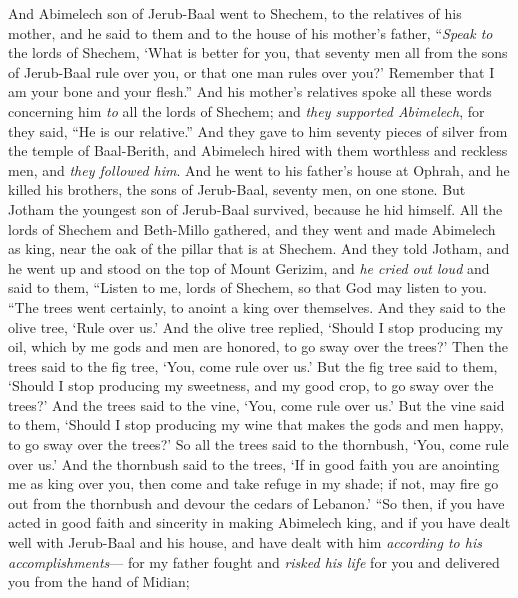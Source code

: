 \begin{biblechapter} %
 And Abimelech son of Jerub-Baal went to Shechem, to the relatives of his mother, and he said to them and to the house of his mother’s father,
\verse “\textit{Speak to} the lords of Shechem, ‘What is better for you, that seventy men all from the sons of Jerub-Baal rule over you, or that one man rules over you?’ Remember that I am your bone and your flesh.”
\verse And his mother’s relatives spoke all these words concerning him \textit{to} all the lords of Shechem; and \textit{they supported Abimelech}, for they said, “He is our relative.”
\verse And they gave to him seventy pieces of silver from the temple of Baal-Berith, and Abimelech hired with them worthless and reckless men, and \textit{they followed him}.
\verse And he went to his father’s house at Ophrah, and he killed his brothers, the sons of Jerub-Baal, seventy men, on one stone. But Jotham the youngest son of Jerub-Baal survived, because he hid himself.
\verse All the lords of Shechem and Beth-Millo gathered, and they went and made Abimelech as king, near the oak of the pillar that is at Shechem.
\verse And they told Jotham, and he went up and stood on the top of Mount Gerizim, and \textit{he cried out loud} and said to them, “Listen to me, lords of Shechem, so that God may listen to you.
\verse “The trees went certainly, 
to anoint a king over themselves. 
And they said to the olive tree, 
‘Rule over us.’
\verse And the olive tree replied, 
‘Should I stop producing my oil, 
which by me gods and men are honored, 
to go sway over the trees?’
\verse Then the trees said to the fig tree, 
‘You, come rule over us.’
\verse But the fig tree said to them, 
‘Should I stop producing my sweetness, 
and my good crop, 
to go sway over the trees?’
\verse And the trees said to the vine, 
‘You, come rule over us.’
\verse But the vine said to them, 
‘Should I stop producing my wine 
that makes the gods and men happy, 
to go sway over the trees?’
\verse So all the trees said to the thornbush, 
‘You, come rule over us.’
\verse And the thornbush said to the trees, 
‘If in good faith you are anointing 
me as king over you, 
then come and take refuge in my shade; 
if not, may fire go out from the thornbush 
and devour the cedars of Lebanon.’
\verse “So then, if you have acted in good faith and sincerity in making Abimelech king, and if you have dealt well with Jerub-Baal and his house, and have dealt with him \textit{according to his accomplishments}—
\verse for my father fought and \textit{risked his life} for you and delivered you from the hand of Midian;

\end{biblechapter}

